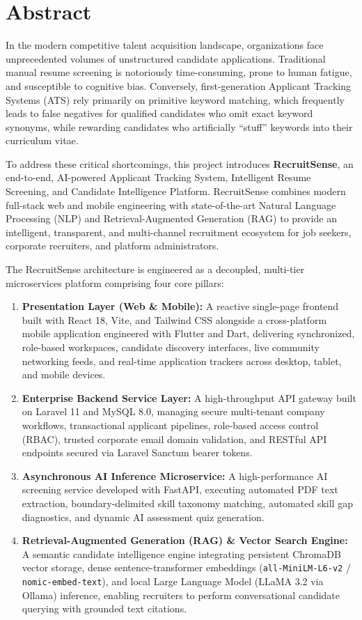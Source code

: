 \chapter*{Abstract}

In the modern competitive talent acquisition landscape, organizations face unprecedented volumes of unstructured candidate applications. Traditional manual resume screening is notoriously time-consuming, prone to human fatigue, and susceptible to cognitive bias. Conversely, first-generation Applicant Tracking Systems (ATS) rely primarily on primitive keyword matching, which frequently leads to false negatives for qualified candidates who omit exact keyword synonyms, while rewarding candidates who artificially ``stuff'' keywords into their curriculum vitae.

To address these critical shortcomings, this project introduces \textbf{RecruitSense}, an end-to-end, AI-powered Applicant Tracking System, Intelligent Resume Screening, and Candidate Intelligence Platform. RecruitSense combines modern full-stack web and mobile engineering with state-of-the-art Natural Language Processing (NLP) and Retrieval-Augmented Generation (RAG) to provide an intelligent, transparent, and multi-channel recruitment ecosystem for job seekers, corporate recruiters, and platform administrators.

The RecruitSense architecture is engineered as a decoupled, multi-tier microservices platform comprising four core pillars:
\begin{enumerate}
    \item \textbf{Presentation Layer (Web \& Mobile):} A reactive single-page frontend built with React 18, Vite, and Tailwind CSS alongside a cross-platform mobile application engineered with Flutter and Dart, delivering synchronized, role-based workspaces, candidate discovery interfaces, live community networking feeds, and real-time application trackers across desktop, tablet, and mobile devices.
    \item \textbf{Enterprise Backend Service Layer:} A high-throughput API gateway built on Laravel 11 and MySQL 8.0, managing secure multi-tenant company workflows, transactional applicant pipelines, role-based access control (RBAC), trusted corporate email domain validation, and RESTful API endpoints secured via Laravel Sanctum bearer tokens.
    \item \textbf{Asynchronous AI Inference Microservice:} A high-performance AI screening service developed with FastAPI, executing automated PDF text extraction, boundary-delimited skill taxonomy matching, automated skill gap diagnostics, and dynamic AI assessment quiz generation.
    \item \textbf{Retrieval-Augmented Generation (RAG) \& Vector Search Engine:} A semantic candidate intelligence engine integrating persistent ChromaDB vector storage, dense sentence-transformer embeddings (\texttt{all-MiniLM-L6-v2} / \texttt{nomic-embed-text}), and local Large Language Model (LLaMA 3.2 via Ollama) inference, enabling recruiters to perform conversational candidate querying with grounded text citations.
\end{enumerate}


